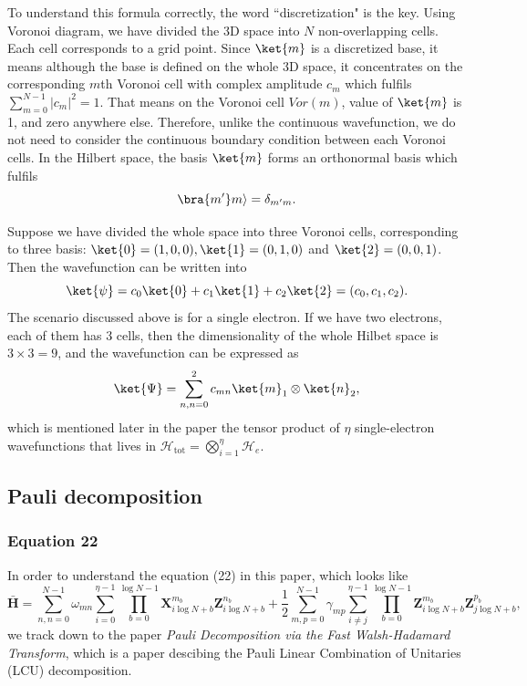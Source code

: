 To understand this formula correctly, the word ``discretization" is the key. Using Voronoi diagram, we have divided the 3D space into $N$ non-overlapping cells. Each cell corresponds to a grid point.  Since $\ket{m}$ is a discretized base, it means although the base is defined on the whole 3D space, it concentrates on the corresponding $m$th Voronoi cell with complex amplitude $c_m$ which fulfils $\sum_{m=0}^{N-1}|c_m|^2=1$. That means on the Voronoi cell $Vor(m)$, value of $\ket{m}$ is 1, and zero anywhere else. Therefore, unlike the continuous wavefunction, we do not need to consider the continuous boundary condition between each Voronoi cells. In the Hilbert space, the basis $\ket{m}$ forms an orthonormal basis which fulfils
\begin{equation}
    \bra{m^{\prime}}m\rangle=\delta_{m^{\prime}m}.
\end{equation}
\begin{example}
    Suppose we have divided the whole space into three Voronoi cells, corresponding to three basis: $\ket{0}=(1,0,0), \ket{1}=(0,1,0)$ and $\ket{2}=(0,0,1)$. Then the wavefunction can be written into
    \begin{equation}
        \ket{\psi}=c_0\ket{0}+c_1\ket{1}+c_2\ket{2}=(c_0,c_1,c_2).
    \end{equation}
    The scenario discussed above is for a single electron. If we have two electrons, each of them has 3 cells, then the dimensionality of the whole Hilbet space is $3\times 3=9$, and the wavefunction can be expressed as
    \begin{equation}
        \ket{\Psi}=\sum_{n,n=0}^{2}c_{mn}\ket{m}_1\otimes\ket{n}_2,
    \end{equation}
    which is mentioned later in the paper the tensor product of $\eta$ single-electron wavefunctions that lives in $\mathcal{H}_{\text{tot}}=\bigotimes_{i=1}^{\eta}\mathcal{H}_e$.
\end{example}

\subsection{Pauli decomposition}
\subsubsection{Equation 22}
 In order to understand the equation (22) in this paper, which looks like
\begin{equation}
    \bar{\textbf{H}}=\sum_{n,n=0}^{N-1}\omega_{mn}\sum_{i=0}^{\eta-1}\prod_{b=0}^{\log N - 1}\textbf{X}_{i\log N+b}^{m_b}\textbf{Z}_{i\log N+b}^{n_b}+\frac{1}{2}\sum_{m,p=0}^{N-1}\gamma_{mp}\sum_{i\neq j}^{\eta-1}\prod_{b=0}^{\log N-1}\textbf{Z}_{i \log N+b}^{m_b}\textbf{Z}_{j \log N+b}^{p_b},
\end{equation}
we track down to the paper \textit{Pauli Decomposition via the Fast Walsh-Hadamard Transform}\cite{Georges_2025}, which is a paper descibing the Pauli Linear Combination of Unitaries (LCU) decomposition.

